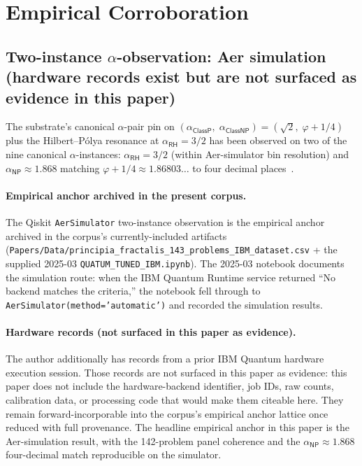 \documentclass[11pt,a4paper]{amsart}
\theoremstyle{plain}
\theoremstyle{definition}
\begin{document}
\section{Empirical Corroboration}\label{sec:empirical}

\subsection{Two-instance \texorpdfstring{$\alpha$}{alpha}-observation: Aer simulation (hardware records exist but are not surfaced as evidence in this paper)}\label{subsec:two-instance}

The substrate's canonical $\alpha$-pair pin on $(\alpha_{\textsf{ClassP}},\;\alpha_{\textsf{ClassNP}})=(\sqrt{2},\;\varphi+1/4)$ plus the Hilbert--P\'olya resonance at $\alpha_{\textsf{RH}}=3/2$ has been observed on two of the nine canonical $\alpha$-instances: $\alpha_{\textsf{RH}}=3/2$ (within Aer-simulator bin resolution) and $\alpha_{\textsf{NP}}\approx 1.868$ matching $\varphi+1/4 \approx 1.86803\ldots$ to four decimal places~\cite{cohen2026book,cohen2025transferOp,cohen2025unifiedClay}.

\paragraph{Empirical anchor archived in the present corpus.} The Qiskit \texttt{AerSimulator} two-instance observation is the empirical anchor archived in the corpus's currently-included artifacts (\texttt{Papers/Data/principia\_fractalis\_143\_problems\_IBM\_dataset.csv} + the supplied 2025-03 \texttt{QUATUM\_TUNED\_IBM.ipynb}). The 2025-03 notebook documents the simulation route: when the IBM Quantum Runtime service returned ``No backend matches the criteria,'' the notebook fell through to \texttt{AerSimulator(method='automatic')} and recorded the simulation results.

\paragraph{Hardware records (not surfaced in this paper as evidence).} The author additionally has records from a prior IBM Quantum hardware execution session. Those records are not surfaced in this paper as evidence: this paper does not include the hardware-backend identifier, job IDs, raw counts, calibration data, or processing code that would make them citeable here. They remain forward-incorporable into the corpus's empirical anchor lattice once reduced with full provenance. The headline empirical anchor in this paper is the Aer-simulation result, with the 142-problem panel coherence and the $\alpha_{\textsf{NP}} \approx 1.868$ four-decimal match reproducible on the simulator.
\end{document}
